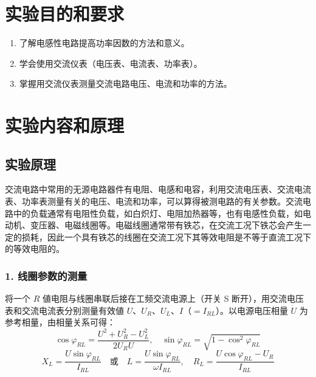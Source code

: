﻿\documentclass[10.5pt]{config}
\date{}
\begin{document}
\makeheader %

\section{实验目的和要求}

\begin{enumerate}[label=\arabic*., leftmargin=2em]
    \item 了解电感性电路提高功率因数的方法和意义。
    \item 学会使用交流仪表（电压表、电流表、功率表）。
    \item 掌握用交流仪表测量交流电路电压、电流和功率的方法。
\end{enumerate}

\section{实验内容和原理}


\subsection{实验原理}

交流电路中常用的无源电路器件有电阻、电感和电容，利用交流电压表、交流电流表、功率表测量有关的电压、电流和功率，可以算得被测电路的有关参数。交流电路中的负载通常有电阻性负载，如白炽灯、电阻加热器等，也有电感性负载，如电动机、变压器、电磁线圈等。电磁线圈通常带有铁芯，在交流工况下铁芯会产生一定的损耗，因此一个具有铁芯的线圈在交流工况下其等效电阻是不等于直流工况下的等效电阻的。

\subsubsection*{1. 线圈参数的测量}

将一个 $R$ 値电阻与线圈串联后接在工频交流电源上（开关 S 断开），用交流电压表和交流电流表分别测量有效値 $U$、$U_R$、$U_L$、$I$（$=I_{RL}$）。以电源电压相量 $\dot{U}$ 为参考相量，由相量关系可得：
\begin{equation*}
    \cos\varphi_{RL} = \frac{U^2 + U_R^2 - U_L^2}{2U_R U}, \quad
    \sin\varphi_{RL} = \sqrt{1 - \cos^2\varphi_{RL}}
\end{equation*}
\begin{equation*}
    X_L = \frac{U\sin\varphi_{RL}}{I_{RL}} \quad \text{或} \quad
    L = \frac{U\sin\varphi_{RL}}{\omega I_{RL}}, \quad
    R_L = \frac{U\cos\varphi_{RL} - U_R}{I_{RL}}
\end{equation*}
\end{document}
